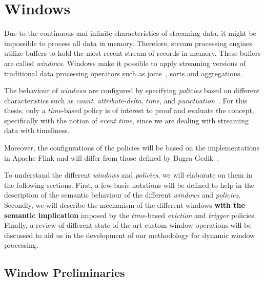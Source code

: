 \chapter{Windows}
\label{chap:windows}

Due to the continuous and infinite characteristics of streaming data, 
it might be impossible to process all data in memory. Therefore, 
stream processing engines utilize buffers to hold the most recent stream of 
records in memory. These buffers are called \emph{windows}. Windows make it 
possible to apply streaming versions of traditional data processing operators such
as joins~\cite{grubjoin}, sorts and aggregations. 

The behaviour of \emph{windows} are configured by specifying \emph{policies}
based on different characteristics such as \emph{count}, \emph{attribute-delta}, \emph{time}, and
\emph{punctuation}~\cite{generic_window_sem}. For this thesis, only a
\emph{time}-based policy is of interest to proof and evaluate the 
concept, specifically with the notion of \emph{event time},
since we are dealing with streaming data with 
timeliness.

Moreover, the configurations of the policies will be based on the 
implementations in Apache Flink and will differ from those defined by 
Bugra Gedik~\cite{generic_window_sem}. 


To understand the different \emph{windows} and \emph{policies}, we will elaborate on them 
in the following sections. First, a few basic notations will be defined to 
help in the description of the semantic behaviour of the different 
\emph{windows} and \emph{policies}. Secondly, we will describe the mechanism of the 
different windows \textbf{with the semantic implication} imposed by the 
\emph{time}-based \emph{eviction} and \emph{trigger} policies. 
Finally, a review of different state-of-the art custom window operations 
will be discussed to aid us in the development of our methodology for 
dynamic window processing. 


\section{Window Preliminaries}%
\label{sec:window_notations}

